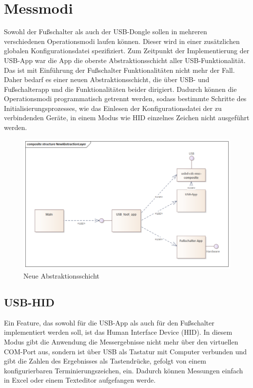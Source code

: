 \section{Messmodi}
Sowohl der Fußschalter als auch der USB-Dongle sollen in mehreren verschiedenen Operationsmodi laufen können. Dieser wird in einer zusätzlichen globalen Konfigurationsdatei spezifiziert. Zum Zeitpunkt der Implementierung der USB-App war die App die oberste Abstraktionsschicht aller USB-Funktionalität. Das ist mit Einführung der Fußschalter Funktionalitäten nicht mehr der Fall. Daher bedarf es einer neuen Abstraktionsschicht, die über USB- und Fußschalterapp und die Funktionalitäten beider dirigiert. Dadurch können die Operationsmodi programmatisch getrennt werden, sodass bestimmte Schritte des Initialisierungsprozesses, wie das Einlesen der Konfigurationsdatei der zu verbindenden Geräte, in einem Modus wie HID einzelnes Zeichen nicht ausgeführt werden.

\begin{figure}[H] 
	\centering
	\includegraphics[width=\textwidth]{figures/NewAbstractionLayer.png}
	\caption{Neue Abstraktionsschicht}
\end{figure}

\subsection{USB-HID}
Ein Feature, das sowohl für die USB-App als auch für den Fußschalter implementiert werden soll, ist das Human Interface Device (HID). In diesem Modus gibt die Anwendung die Messergebnisse nicht mehr über den virtuellen COM-Port aus, sondern ist über USB als Tastatur mit Computer verbunden und gibt die Zahlen des Ergebnisses als Tastendrücke, gefolgt von einem konfigurierbaren Terminierungszeichen, ein. Dadurch können Messungen einfach in Excel oder einem Texteditor aufgefangen werde. 

